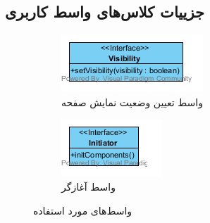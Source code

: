 \subsection{جزییات کلاس‌های واسط کاربری}
\begin{figure}[H]
	\centering
	\begin{subfigure}[b]{0.4\textwidth}
		\includegraphics[width=\textwidth]{img/class-design/ui/Visibility.png}
		\caption{واسط تعیین وضعیت نمایش صفحه}
	\end{subfigure}
	\begin{subfigure}[b]{0.3\textwidth}
	\includegraphics[width=\textwidth]{img/class-design/ui/initiator.png}
	\caption{واسط آغازگر   }			
	\end{subfigure}
	\caption{واسط‌های مورد استفاده}
\end{figure}

